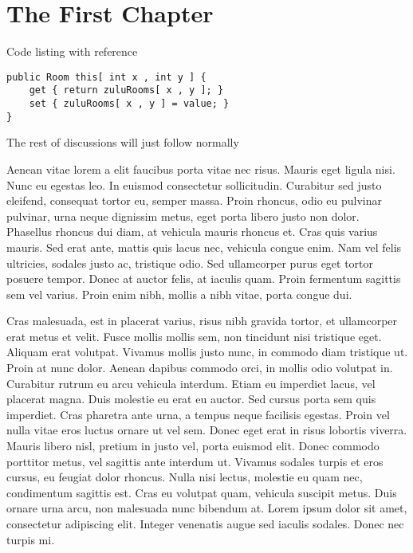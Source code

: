 \chapter{The First Chapter}

Code listing with reference 

\begin{lstlisting}[label=lst:zuluroomsThis,caption=Section of the \texttt{ZuluRooms} indexer]
public Room this[ int x , int y ] {
	get { return zuluRooms[ x , y ]; }
	set { zuluRooms[ x , y ] = value; }
}
\end{lstlisting}

The rest of discussions will just follow normally

Aenean vitae lorem a elit faucibus porta vitae nec risus. Mauris eget ligula nisi. Nunc eu egestas leo. In euismod consectetur sollicitudin. Curabitur sed justo eleifend, consequat tortor eu, semper massa. Proin rhoncus, odio eu pulvinar pulvinar, urna neque dignissim metus, eget porta libero justo non dolor. Phasellus rhoncus dui diam, at vehicula mauris rhoncus et. Cras quis varius mauris. Sed erat ante, mattis quis lacus nec, vehicula congue enim. Nam vel felis ultricies, sodales justo ac, tristique odio. Sed ullamcorper purus eget tortor posuere tempor. Donec at auctor felis, at iaculis quam. Proin fermentum sagittis sem vel varius. Proin enim nibh, mollis a nibh vitae, porta congue dui.

Cras malesuada, est in placerat varius, risus nibh gravida tortor, et ullamcorper erat metus et velit. Fusce mollis mollis sem, non tincidunt nisi tristique eget. Aliquam erat volutpat. Vivamus mollis justo nunc, in commodo diam tristique ut. Proin at nunc dolor. Aenean dapibus commodo orci, in mollis odio volutpat in. Curabitur rutrum eu arcu vehicula interdum. Etiam eu imperdiet lacus, vel placerat magna. Duis molestie eu erat eu auctor. Sed cursus porta sem quis imperdiet. Cras pharetra ante urna, a tempus neque facilisis egestas. Proin vel nulla vitae eros luctus ornare ut vel sem. Donec eget erat in risus lobortis viverra. Mauris libero nisl, pretium in justo vel, porta euismod elit. Donec commodo porttitor metus, vel sagittis ante interdum ut. Vivamus sodales turpis et eros cursus, eu feugiat dolor rhoncus. Nulla nisi lectus, molestie eu quam nec, condimentum sagittis est. Cras eu volutpat quam, vehicula suscipit metus. Duis ornare urna arcu, non malesuada nunc bibendum at. Lorem ipsum dolor sit amet, consectetur adipiscing elit. Integer venenatis augue sed iaculis sodales. Donec nec turpis mi.